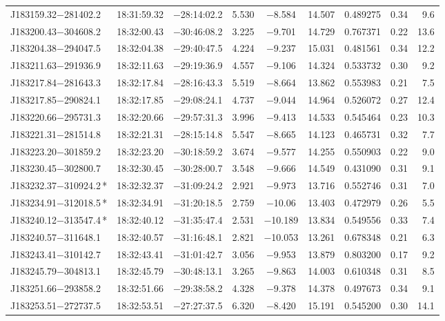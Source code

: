 \begin{table*}
\begin{tabular}{lcccccccr}
J183159.32$-$281402.2 & 18:31:59.32 & $-$28:14:02.2 &  5.530 & $-$8.584 & 14.507 & 0.489275 & 0.34 & 9.6 \\
J183200.43$-$304608.2 & 18:32:00.43 & $-$30:46:08.2 &  3.225 & $-$9.701 & 14.729 & 0.767371 & 0.22 & 13.6 \\
J183204.38$-$294047.5 & 18:32:04.38 & $-$29:40:47.5 &  4.224 & $-$9.237 & 15.031 & 0.481561 & 0.34 & 12.2 \\
J183211.63$-$291936.9 & 18:32:11.63 & $-$29:19:36.9 &  4.557 & $-$9.106 & 14.324 & 0.533732 & 0.30 & 9.2 \\
J183217.84$-$281643.3 & 18:32:17.84 & $-$28:16:43.3 &  5.519 & $-$8.664 & 13.862 & 0.553983 & 0.21 & 7.5 \\
J183217.85$-$290824.1 & 18:32:17.85 & $-$29:08:24.1 &  4.737 & $-$9.044 & 14.964 & 0.526072 & 0.27 & 12.4 \\
J183220.66$-$295731.3 & 18:32:20.66 & $-$29:57:31.3 &  3.996 & $-$9.413 & 14.533 & 0.545464 & 0.23 & 10.3 \\
J183221.31$-$281514.8 & 18:32:21.31 & $-$28:15:14.8 &  5.547 & $-$8.665 & 14.123 & 0.465731 & 0.32 & 7.7 \\
J183223.20$-$301859.2 & 18:32:23.20 & $-$30:18:59.2 &  3.674 & $-$9.577 & 14.255 & 0.550903 & 0.22 & 9.0 \\
J183230.45$-$302800.7 & 18:32:30.45 & $-$30:28:00.7 &  3.548 & $-$9.666 & 14.549 & 0.431090 & 0.31 & 9.1 \\
J183232.37$-$310924.2\,* & 18:32:32.37 & $-$31:09:24.2 &  2.921 & $-$9.973 & 13.716 & 0.552746 & 0.31 & 7.0 \\
J183234.91$-$312018.5\,* & 18:32:34.91 & $-$31:20:18.5 &  2.759 & $-$10.06 & 13.403 & 0.472979 & 0.26 & 5.5 \\
J183240.12$-$313547.4\,* & 18:32:40.12 & $-$31:35:47.4 &  2.531 & $-$10.189 & 13.834 & 0.549556 & 0.33 & 7.4 \\
J183240.57$-$311648.1 & 18:32:40.57 & $-$31:16:48.1 &  2.821 & $-$10.053 & 13.261 & 0.678348 & 0.21 & 6.3 \\
J183243.41$-$310142.7 & 18:32:43.41 & $-$31:01:42.7 &  3.056 & $-$9.953 & 13.879 & 0.803200 & 0.17 & 9.2 \\
J183245.79$-$304813.1 & 18:32:45.79 & $-$30:48:13.1 &  3.265 & $-$9.863 & 14.003 & 0.610348 & 0.31 & 8.5 \\
J183251.66$-$293858.2 & 18:32:51.66 & $-$29:38:58.2 &  4.328 & $-$9.378 & 14.378 & 0.497673 & 0.34 & 9.1 \\
J183253.51$-$272737.5 & 18:32:53.51 & $-$27:27:37.5 &  6.320 & $-$8.420 & 15.191 & 0.545200 & 0.30 & 14.1 \\

\end{tabular}
\end{table*}
